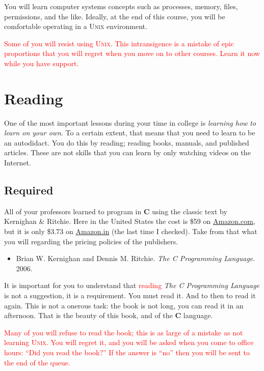 \documentclass{article}
\begin{document}
You will learn computer systems concepts such as processes, memory,
files, permissions, and the like. Ideally, at the end of this course,
you will be comfortable operating in a \textsc{Unix} environment.

\textcolor{red}{Some of you will resist using \textsc{Unix}. This
intransigence is a mistake of epic proportions that you will regret
when you move on to other courses. Learn it now while you have
support.}

\section{Reading}

One of the most important lessons during your time in college is
\emph{learning how to learn on your own}. To a certain extent, that
means that you need to learn to be an autodidact. You do this by
reading; reading books, manuals, and published articles. These are
not skills that you can learn by only watching videos on the Internet.

\subsection{Required}

All of your professors learned to program in \textbf{C} using the
classic text by Kernighan \& Ritchie.  Here in the United States
the cost is \$59 on \url{Amazon.com}, but it is only \$3.73 on
\url{Amazon.in} (the last time I checked).  Take from that what you
will regarding the pricing policies of the publishers.

\begin{itemize}
\item
Brian W. Kernighan and Dennis M. Ritchie. \emph{The C Programming Language}. 2006.
\end{itemize}

It is important for you to understand that \textcolor{red}{reading}
\emph{The C Programming Language} is not a suggestion, it is a requirement. You must
read it. And to then to read it again.  This is not a onerous
task: the book is not long, you can read it in an afternoon. That
is the beauty of this book, and of the \textbf{C} language.

\textcolor{red}{Many of you will refuse to read the book; this is as large of a mistake as not
learning \textsc{Unix}. You will regret it, and you will be asked when you come to office hours:
``Did you read the book?'' If the answer is ``no'' then you will be sent to the end of the queue.}
\end{document}

